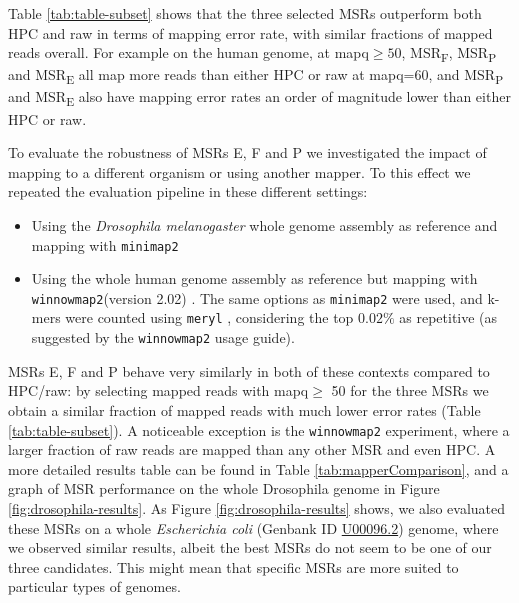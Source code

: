\documentclass[
  11pt,
  twoside,
  BCOR=10mm,
  listof=totoc]{scrbook}
\begin{document}
Table \ref{tab:table-subset} shows that the three selected MSRs outperform both HPC and raw in terms of mapping error rate, with similar fractions of mapped reads overall. For example on the human genome, at mapq\(\geq 50\), MSR\textsubscript{F}, MSR\textsubscript{P} and MSR\textsubscript{E} all map more reads than either HPC or raw at mapq=60, and MSR\textsubscript{P} and MSR\textsubscript{E} also have mapping error rates an order of magnitude lower than either HPC or raw.

To evaluate the robustness of MSRs E, F and P we investigated the impact of mapping to a different organism or using another mapper. To this effect we repeated the evaluation pipeline in these different settings:

\begin{itemize}
\item
  Using the \emph{Drosophila melanogaster} whole genome assembly as reference and mapping with \texttt{minimap2}
\item
  Using the whole human genome assembly as reference but mapping with \texttt{winnowmap2}(version 2.02) \autocite{jainWeightedMinimizerSampling2020}. The same options as \texttt{minimap2} were used, and k-mers were counted using \texttt{meryl} \autocite{rhieMerquryReferencefreeQuality2020}, considering the top \(0.02\%\) as repetitive (as suggested by the \texttt{winnowmap2} usage guide).
\end{itemize}

MSRs E, F and P behave very similarly in both of these contexts compared to HPC/raw: by selecting mapped reads with mapq\(\geq\) 50 for the three MSRs we obtain a similar fraction of mapped reads with much lower error rates (Table \ref{tab:table-subset}). A noticeable exception is the \texttt{winnowmap2} experiment, where a larger fraction of raw reads are mapped than any other MSR and even HPC. A more detailed results table can be found in Table \ref{tab:mapperComparison}, and a graph of MSR performance on the whole Drosophila genome in Figure \ref{fig:drosophila-results}. As Figure \ref{fig:drosophila-results} shows, we also evaluated these MSRs on a whole \emph{Escherichia coli} (Genbank ID \href{https://www.ncbi.nlm.nih.gov/nuccore/U00096.2}{U00096.2}) genome, where we observed similar results, albeit the best MSRs do not seem to be one of our three candidates. This might mean that specific MSRs are more suited to particular types of genomes.
\end{document}
